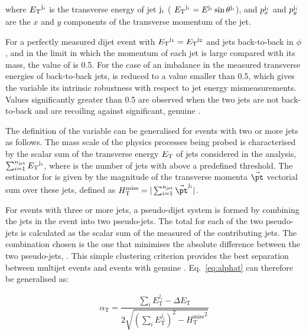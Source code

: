 where ${E_{\text T}}^{{\rm j}_i}$ is the transverse energy of jet ${\rm j}_i$ (
${E_{\text T}}^{{\rm j}_i} = E^{{\rm j}_i}\sin\theta^{{\rm j}_i}$), and
$p_x^{{\rm j}_i}$ and $p_y^{{\rm j}_i}$ are the $x$ and $y$ components
of the transverse momentum of the jet.

For a perfectly measured dijet event with ${E_{\text T}}^{\rm j_1} = {E_{\text T}}^{\rm
  j_2}$ and jets back-to-back in $\phi$, and in the limit in which the
momentum of each jet is large compared with its mass, the value of
\alphat is 0.5. For the case of an imbalance in the measured
transverse energies of back-to-back jets, \alphat is reduced to a
value smaller than 0.5, which gives the variable its intrinsic
robustness with respect to jet energy mismeasurements. Values
significantly greater than 0.5 are observed when the two jets are not
back-to-back and are recoiling against significant, genuine \met.

The definition of the \alphat variable can be generalised for events
with two or more jets as follows. The mass scale of the physics
processes being probed is characterised by the scalar sum of the
transverse energy ${E_{\text T}}$ of jets considered in the analysis,
$\sum_{i=1}^{n_{\text{jet}}} {E_{\text T}}^{{\rm j}_i}$, where \njet is the
number of jets with \Et above a predefined threshold. The estimator
for \met is given by the magnitude of the transverse momenta
$\vec{\pt}$ vectorial sum over these jets, defined as $\mht =
|\sum_{i=1}^{n_{\rm jet}} \vec{\pt}^{{\rm j}_i}|$.

For events with three or more jets, a pseudo-dijet system is formed by
combining the jets in the event into two pseudo-jets. The total \Et
for each of the two pseudo-jets is calculated as the scalar sum of the
measured \Et of the contributing jets. The combination chosen is the
one that minimises the absolute \Et difference between the two
pseudo-jets, \dEt. This simple clustering criterion provides the best
separation between multijet events and events with genuine
\met. Eq.~\ref{eq:alphat} can therefore be generalised as:

\begin{equation}
  \label{eq:alphat2}
   \alpha_\textrm{T} = \frac{\sum_{i} E_\textrm{T}^{j_i} - \Delta E_\textrm{T}}{2\sqrt{\left(\sum_{i} E_\textrm{T}^{j_i}\right)^2 - {H_\textrm{T}^{\textrm{miss}}}^2}}
\end{equation}


